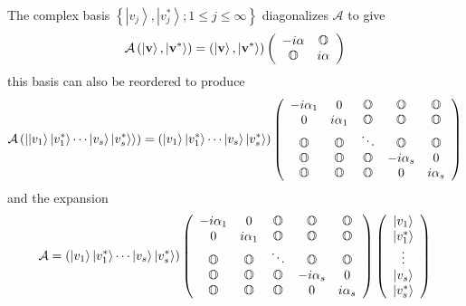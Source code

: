 \documentclass[aps,preprint]{revtex4}%
\begin{document}
The complex basis $\left\{  \left\vert v_{j}\right\rangle ,\left\vert
v_{j}^{\ast}\right\rangle ;1\leq j\leq\infty\right\}  $ diagonalizes
$\mathcal{A}$ to give
\begin{equation}
\mathcal{A}\left(  \left\vert \mathbf{v}\right\rangle ,\left\vert
\mathbf{v}^{\ast}\right\rangle \right)  =\left(  \left\vert \mathbf{v}%
\right\rangle ,\left\vert \mathbf{v}^{\ast}\right\rangle \right)  \left(
\begin{array}
[c]{cc}%
-i\mathbf{\alpha} & \mathbb{O}\\
\mathbb{O} & i\mathbf{\alpha}%
\end{array}
\right)
\end{equation}
this basis can also be reordered to produce
\begin{equation}
\mathcal{A}\left(  \left\vert \left\vert v_{1}\right\rangle \left\vert
v_{1}^{\ast}\right\rangle \cdots\left\vert v_{s}\right\rangle \left\vert
v_{s}^{\ast}\right\rangle \right\rangle \right)  =\left(  \left\vert
v_{1}\right\rangle \left\vert v_{1}^{\ast}\right\rangle \cdots\left\vert
v_{s}\right\rangle \left\vert v_{s}^{\ast}\right\rangle \right)  \left(
\begin{array}
[c]{ccccc}%
-i\alpha_{1} & 0 & \mathbb{O} & \mathbb{O} & \mathbb{O}\\
0 & i\alpha_{1} & \mathbb{O} & \mathbb{O} & \mathbb{O}\\
\mathbb{O} & \mathbb{O} & \ddots & \mathbb{O} & \mathbb{O}\\
\mathbb{O} & \mathbb{O} & \mathbb{O} & -i\alpha_{s} & 0\\
\mathbb{O} & \mathbb{O} & \mathbb{O} & 0 & i\alpha_{s}%
\end{array}
\right)
\end{equation}
and the expansion%
\begin{equation}
\mathcal{A}=\left(  \left\vert v_{1}\right\rangle \left\vert v_{1}^{\ast
}\right\rangle \cdots\left\vert v_{s}\right\rangle \left\vert v_{s}^{\ast
}\right\rangle \right)  \left(
\begin{array}
[c]{ccccc}%
-i\alpha_{1} & 0 & \mathbb{O} & \mathbb{O} & \mathbb{O}\\
0 & i\alpha_{1} & \mathbb{O} & \mathbb{O} & \mathbb{O}\\
\mathbb{O} & \mathbb{O} & \ddots & \mathbb{O} & \mathbb{O}\\
\mathbb{O} & \mathbb{O} & \mathbb{O} & -i\alpha_{s} & 0\\
\mathbb{O} & \mathbb{O} & \mathbb{O} & 0 & i\alpha_{s}%
\end{array}
\right)  \left(
\begin{array}
[c]{c}%
\left\vert v_{1}\right\rangle \\
\left\vert v_{1}^{\ast}\right\rangle \\
\vdots\\
\left\vert v_{s}\right\rangle \\
\left\vert v_{s}^{\ast}\right\rangle
\end{array}
\right) \label{ccex}%
\end{equation}
\end{document}
